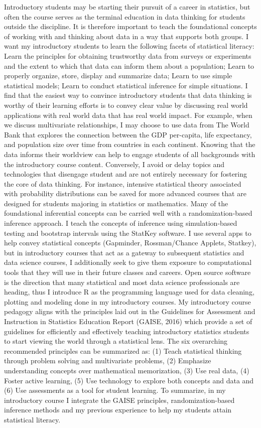 \documentclass[letterpaper,12pt]{article}\usepackage[]{graphicx}\usepackage[]{color}
\begin{document}
Introductory students may be starting their pursuit of a career in statistics, but often the course serves as the terminal education in data thinking for students outside the discipline. It is therefore important to teach the foundational concepts of working with and thinking about data in a way that supports both groups. I want my introductory students to learn the following facets of statistical literacy: Learn the principles for obtaining trustworthy data from surveys or experiments and the extent to which that data can inform them about a population; Learn to properly organize, store, display and summarize data; Learn to use simple statistical models; Learn to conduct statistical inference for simple situations. I find that the easiest way to convince introductory students that data thinking is worthy of their learning efforts is to convey clear value by discussing real world applications with real world data that has real world impact. For example, when we discuss multivariate relationships, I may choose to use data from The World Bank that explores the connection between the GDP per-capita, life expectancy, and population size over time from countries in each continent. Knowing that the data informs their worldview can help to engage students of all backgrounds with the introductory course content. Conversely, I avoid or delay topics and technologies that disengage student and are not entirely necessary for fostering the core of data thinking. For instance, intensive statistical theory associated with probability distributions can be saved for more advanced courses that are designed for students majoring in statistics or mathematics. Many of the foundational inferential concepts can be carried well with a randomization-based inference approach. I teach the concepts of inference using simulation-based testing and bootstrap intervals using the StatKey software.  I use several apps to help convey statistical concepts (Gapminder, Rossman/Chance Applets, Statkey), but in introductory courses that act as a gateway to subsequent statistics and data science courses, I additionally seek to give them exposure to computational tools that they will use in their future classes and careers. Open source software is the direction that many statistical and most data science professionals are heading, thus I introduce R as the programming language used for data cleaning, plotting and modeling done in my introductory courses.  My introductory course pedagogy aligns with the principles laid out in the Guidelines for Assessment and Instruction in Statistics Education Report (GAISE, 2016) which provide a set of guidelines for efficiently and effectively teaching introductory statistics students to start viewing the world through a statistical lens. The six overarching recommended principles can be summarized as: (1) Teach statistical thinking through problem solving and multivariate problems, (2) Emphasize understanding concepts over mathematical memorization, (3) Use real data, (4) Foster active learning, (5) Use technology to explore both concepts and data and (6) Use assessments as a tool for student learning. To summarize, in my introductory course I integrate the GAISE principles, randomization-based inference methods and my previous experience to help my students attain statistical literacy.
\end{document}
